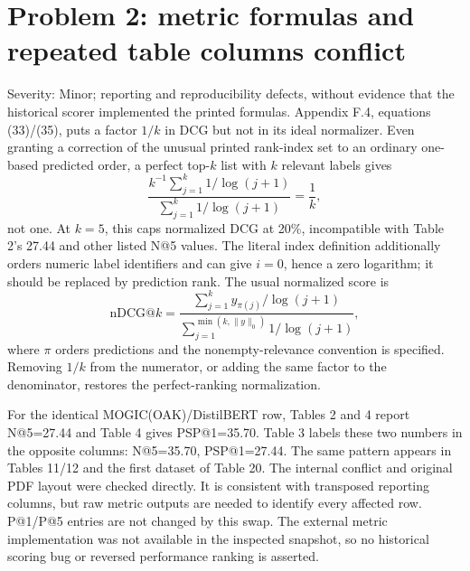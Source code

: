 \documentclass[10pt]{article}
\begin{document}
\section*{Problem 2: metric formulas and repeated table columns conflict}
Severity: Minor; reporting and reproducibility defects, without evidence that the historical scorer implemented the printed formulas. Appendix F.4, equations (33)/(35), puts a factor \(1/k\) in DCG but not in its ideal normalizer. Even granting a correction of the unusual printed rank-index set to an ordinary one-based predicted order, a perfect top-\(k\) list with \(k\) relevant labels gives \[\frac{k^{-1}\sum_{j=1}^k1/\log(j+1)}
 {\sum_{j=1}^k1/\log(j+1)}=\frac1k,\] not one. At \(k=5\), this caps normalized DCG at 20\%, incompatible with Table 2’s 27.44 and other listed N@5 values. The literal index definition additionally orders numeric label identifiers and can give \(i=0\), hence a zero logarithm; it should be replaced by prediction rank. The usual normalized score is \[\mathrm{nDCG}@k=
 \frac{\sum_{j=1}^k y_{\pi(j)}/\log(j+1)}
 {\sum_{j=1}^{\min(k,\|y\|_0)}1/\log(j+1)},\] where \(\pi\) orders predictions and the nonempty-relevance convention is specified. Removing \(1/k\) from the numerator, or adding the same factor to the denominator, restores the perfect-ranking normalization.\par
For the identical MOGIC(OAK)/DistilBERT row, Tables 2 and 4 report N@5=27.44 and Table 4 gives PSP@1=35.70. Table 3 labels these two numbers in the opposite columns: N@5=35.70, PSP@1=27.44. The same pattern appears in Tables 11/12 and the first dataset of Table 20. The internal conflict and original PDF layout were checked directly. It is consistent with transposed reporting columns, but raw metric outputs are needed to identify every affected row. P@1/P@5 entries are not changed by this swap. The external metric implementation was not available in the inspected snapshot, so no historical scoring bug or reversed performance ranking is asserted.\par
\end{document}
